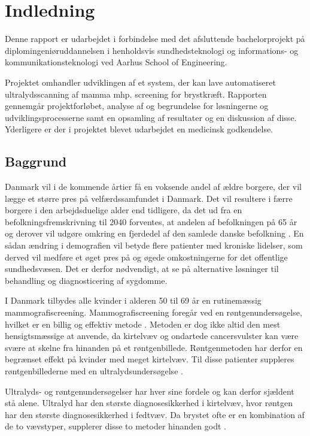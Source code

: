 \chapter{Indledning}
Denne rapport er udarbejdet i forbindelse med det afsluttende bachelorprojekt på diplomingeniøruddannelsen i henholdsvis sundhedsteknologi og informations- og kommunikationsteknologi ved Aarhus School of Engineering.

Projektet omhandler udviklingen af et system, der kan lave automatiseret ultralydsscanning af mamma mhp. screening for brystkræft. Rapporten gennemgår projektforløbet, analyse af og begrundelse for løsningerne og udviklingsprocesserne samt en opsamling af resultater og en diskussion af disse. Yderligere er der i projektet blevet udarbejdet en medicinsk godkendelse. 

\section{Baggrund}
Danmark vil i de kommende årtier få en voksende andel af ældre borgere, der vil lægge et større pres på velfærdssamfundet i Danmark. Det vil resultere i færre borgere i den arbejdsduelige alder end tidligere, da det ud fra en befolkningsfremskrivning til 2040 forventes, at andelen af befolkningen på 65 år og derover vil udgøre omkring en fjerdedel af den samlede danske befolkning \cite{Befolk}. En sådan ændring i demografien vil betyde flere patienter med kroniske lidelser, som derved vil medføre et øget pres på og øgede omkostningerne for det offentlige sundhedsvæsen. Det er derfor nødvendigt, at se på alternative løsninger til behandling og diagnosticering af sygdomme. 

I Danmark tilbydes alle kvinder i alderen 50 til 69 år en rutinemæssig mammografiscreening. Mammografiscreening foregår ved en røntgenundersøgelse, hvilket er en billig og effektiv metode \cite{Afsloring}. Metoden er dog ikke altid den mest hensigtsmæssige at anvende, da kirtelvæv og ondartede cancersvulster kan være svære at skelne fra hinanden på et røntgenbillede. Røntgenmetoden har derfor en begrænset effekt på kvinder med meget kirtelvæv. Til disse patienter suppleres røntgenbillederne med en ultralydsundersøgelse \cite{Ultralyd}.

Ultralyds- og røntgenundersøgelser har hver sine fordele og kan derfor sjældent stå alene. Ultralyd har den største diagnosesikkerhed i kirtelvæv, hvor røntgen har den største diagnosesikkerhed i fedtvæv. Da brystet ofte er en kombination af de to vævstyper, supplerer disse to metoder hinanden godt \cite{Ultralyd}. 

